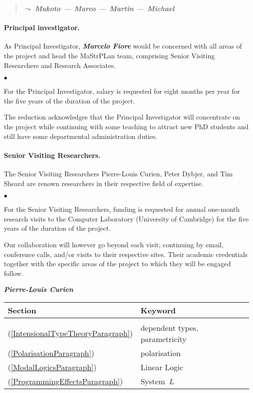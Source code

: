 \documentclass[11pt,twocolumn]{article}
\newenvironment{myitemize}
  {\begin{list}{$\bullet$}
  {\setlength{\topsep}{2pt}
   \setlength{\partopsep}{2pt}
   \setlength{\itemsep}{2.5pt}
   \setlength{\parsep}{2.5pt}
   \setlength{\leftmargin}{1em}
   \setlength{\labelwidth}{.5em}}}
  {\end{list}}
\newcommand{\erc}{{\small\sf MaStrPLan}}
\newcommand{\note}[1]%
{\begin{quote}{\color{blue}$\leadsto$ \bf\em #1}\end{quote}}
\newcommand{\SystemL}{\mbox{System~$L$}}
\begin{document}
\note{Makoto --- Marco --- Martin --- Michael}

\paragraph*{Principal investigator.}

As Principal Investigator, \textbf{\em Marcelo Fiore} would be concerned with
all areas of the project and head the {\erc} team, comprising Senior Visiting
Researchers and Research Associates.  
\begin{myitemize}
\item
For the Principal Investigator, salary is requested for eight months per
year for the five years of the duration of the project.  
\end{myitemize}
The reduction acknowledges that the Principal Investigator will concentrate on the project while continuing with some teaching to attract new PhD students and still have some departmental administration duties.

\paragraph*{Senior Visiting Researchers.}

The Senior Visiting Researchers Pierre-Louis Curien, Peter Dybjer, and Tim
Sheard are renown researchers in their respective field of expertise.  
\begin{myitemize}
\item
For the Senior Visiting Researchers, funding is requested for annual one-month
research visits to the Computer Laboratory (University of Cambridge) for the
five years of the duration of the project.  
\end{myitemize}
Our collaboration will however go beyond each visit; continuing by email,
conference calls, and/or visits to their respective sites. 
Their academic credentials together with the specific areas of the project
to which they will be engaged follow.

\smallskip\noindent
\textbf{\em Pierre-Louis Curien}

\begin{tabular}{l|l}
Section & Keyword
\\ \hline
\\
(\ref{IntensionalTypeTheoryParagraph}) & dependent types, parametricity
\\
(\ref{PolarisationParagraph}) & polarisation
\\
(\ref{ModalLogicsParagraph}) & Linear Logic
\\
(\ref{ProgrammingEffectsParagraph}) & \SystemL
\\
\end{tabular}
\end{document}
